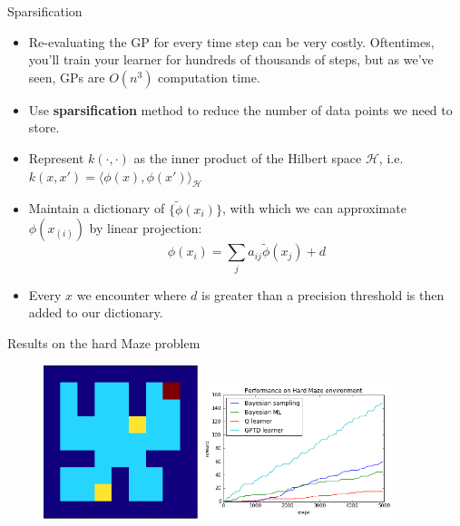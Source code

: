 \documentclass{beamer}
\begin{document}
\begin{frame}{Sparsification}

\begin{itemize}
\item Re-evaluating the GP for every time step can be very costly. Oftentimes, you'll train your learner for hundreds of thousands of steps, but as we've seen, GPs are $O(n^3)$ computation time.
\item Use \textbf{sparsification} method to reduce the number of data points we need to store.
\item Represent $k(\cdot, \cdot)$ as the inner product of the Hilbert space $\mathcal{H}$, i.e.
$k(x, x') = \langle \phi(x), \phi(x') \rangle_{\mathcal{H}}$
\item Maintain
a dictionary of $\{\tilde{\phi}(x_i)\}$, with which we can approximate $\phi(x_{(i)})$ by linear projection:
$$\phi(x_i) = \sum_j a_{ij} \tilde{\phi}(x_j) + d$$
\item Every $x$ we encounter where $d$ is greater than a precision threshold is then added to our dictionary.
\end{itemize}
\end{frame}



\begin{frame}{Results on the hard Maze problem}
\begin{figure}[!htb]
\centering
\includegraphics[width=0.4\textwidth]{hardmaze}
\includegraphics[width=0.5\textwidth]{gptdCompare}
\end{figure}
\end{frame}
\end{document}
